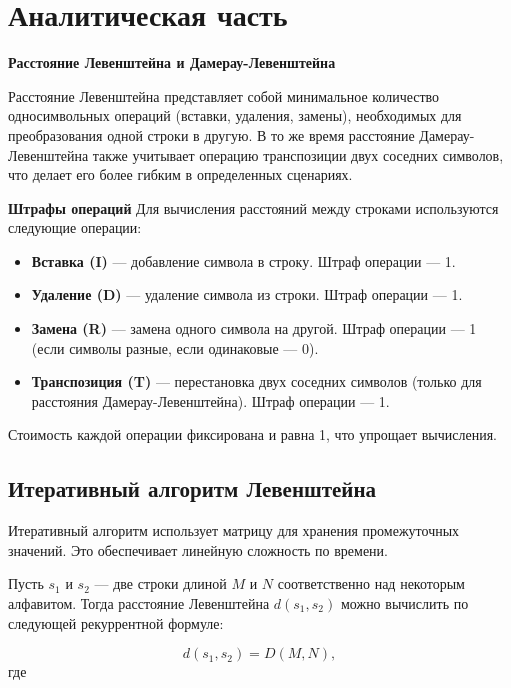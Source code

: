 \chapter{Аналитическая часть}

\textbf{Расстояние Левенштейна и Дамерау-Левенштейна}

Расстояние Левенштейна представляет собой минимальное количество односимвольных операций (вставки, удаления, замены), необходимых для преобразования одной строки в другую. В то же время расстояние Дамерау-Левенштейна также учитывает операцию транспозиции двух соседних символов, что делает его более гибким в определенных сценариях.

\textbf{Штрафы операций}
Для вычисления расстояний между строками используются следующие операции:

\begin{itemize}
    \item \textbf{Вставка (I)} — добавление символа в строку. Штраф операции — 1.
    \item \textbf{Удаление (D)} — удаление символа из строки. Штраф операции — 1.
    \item \textbf{Замена (R)} — замена одного символа на другой. Штраф операции — 1 (если символы разные, если одинаковые — 0).
    \item \textbf{Транспозиция (T)} — перестановка двух соседних символов (только для расстояния Дамерау-Левенштейна). Штраф операции — 1.
\end{itemize}

Стоимость каждой операции фиксирована и равна 1, что упрощает вычисления.

\section{Итеративный алгоритм Левенштейна}

Итеративный алгоритм использует матрицу для хранения промежуточных значений. Это обеспечивает линейную сложность по времени.

Пусть \( s_1 \) и \( s_2 \) — две строки длиной \( M \) и \( N \) соответственно над некоторым алфавитом. Тогда расстояние Левенштейна \( d(s_1, s_2) \) можно вычислить по следующей рекуррентной формуле:

\begin{equation}
d(s_1, s_2) = D(M, N),
\end{equation}
где

